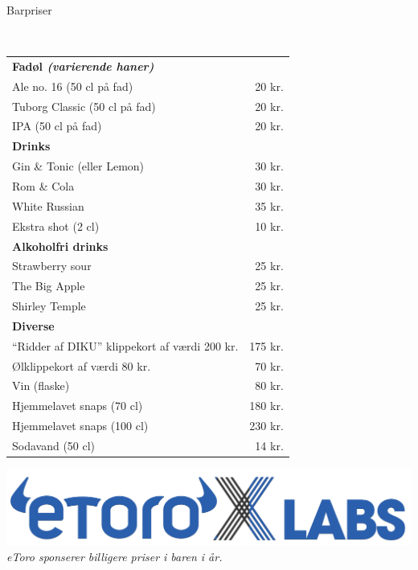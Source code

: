 \begin{flushleft}
\begin{huge}
Barpriser
\end{huge}
\\[.1cm]
\begin{table}[h!]
\begin{tabular}{lr}
\textbf{Fadøl \emph{(varierende haner)}} & \\
Ale no. 16 (50 cl på fad) & 20 kr.\\
Tuborg Classic (50 cl på fad) & 20 kr.\\
IPA (50 cl på fad) & 20 kr.\\[2ex]
\textbf{Drinks} & \\
Gin \& Tonic (eller Lemon) & 30 kr.\\
Rom \& Cola & 30 kr.\\
White Russian & 35 kr.\\
Ekstra shot (2 cl) & 10 kr.\\[2ex]
\textbf{Alkoholfri drinks} & \\
Strawberry sour & 25 kr.\\
The Big Apple & 25 kr.\\
Shirley Temple & 25 kr.\\[2ex]
\textbf{Diverse} & \\
``Ridder af DIKU'' klippekort af værdi 200 kr. & 175 kr.\\
Ølklippekort af værdi 80 kr. & 70 kr.\\
Vin (flaske) & 80 kr.\\
Hjemmelavet snaps (70 cl) & 180 kr.\\
Hjemmelavet snaps (100 cl) & 230 kr.\\
Sodavand (50 cl) & 14 kr.\\
\end{tabular}
\end{table}
\end{flushleft}
\vfill
\begin{center}
\includegraphics[width=.9\linewidth]{etoro-labs-logo.pdf}
\\[2mm]\emph{eToro sponserer billigere priser i baren i år.}
\end{center}
